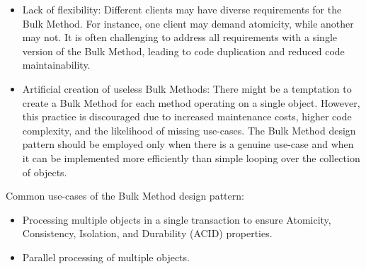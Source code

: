 \begin{itemize}
    \item Lack of flexibility:
    Different clients may have diverse requirements for the Bulk Method.
    For instance, one client may demand atomicity, while another may not.
    It is often challenging to address all requirements with a single version of the Bulk Method,
    leading to code duplication and reduced code maintainability.
    \item Artificial creation of useless Bulk Methods:
    There might be a temptation to create a Bulk Method for each method operating on a single object.
    However, this practice is discouraged due to increased maintenance costs, higher code complexity,
    and the likelihood of missing use-cases.
    The Bulk Method design pattern should be employed only when there is a genuine use-case and when
    it can be implemented more efficiently than simple looping over the collection of objects.
\end{itemize}

Common use-cases of the Bulk Method design pattern:

\begin{itemize}
    \item
    Processing multiple objects in a single transaction to ensure Atomicity, Consistency, Isolation,
    and Durability (ACID) properties.
    \item Parallel processing of multiple objects.
\end{itemize}
